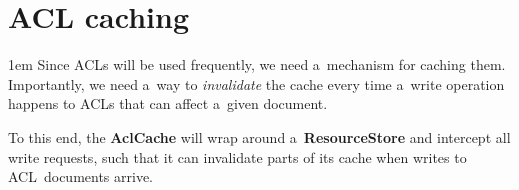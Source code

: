 \documentclass[10pt]{article}
\newcommand\component[1]{\mbox{\bf #1}}
\newenvironment{Note}
  {\begin{multicols}{3}%
     \parskip 1em}
  {\end{multicols}}
\begin{document}
\section*{ACL caching}

\begin{Note}
Since ACLs will be used frequently,
we need a~mechanism for caching them.
Importantly, we need a~way to \emph{invalidate} the cache
every time a~write operation happens
to ACLs that can affect a~given document.

\columnbreak
To this end,
the \component{AclCache} will wrap around a~\component{ResourceStore}
and intercept all write requests,
such that it can invalidate parts of its cache
when writes to ACL~documents arrive.

\columnbreak
\null

\end{Note}
\end{document}
